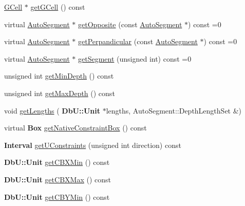 \begin{DoxyCompactItemize}
\mbox{\hyperlink{classKatabatic_1_1GCell}{G\+Cell}} $\ast$ \mbox{\hyperlink{classKatabatic_1_1AutoContact_a819cf639562a031a1e2e061fe1293d66}{get\+G\+Cell}} () const
\item 
virtual \mbox{\hyperlink{classKatabatic_1_1AutoSegment}{Auto\+Segment}} $\ast$ \mbox{\hyperlink{classKatabatic_1_1AutoContact_a48ab1d3bdf85712e4784ef83ef136939}{get\+Opposite}} (const \mbox{\hyperlink{classKatabatic_1_1AutoSegment}{Auto\+Segment}} $\ast$) const =0
\item 
virtual \mbox{\hyperlink{classKatabatic_1_1AutoSegment}{Auto\+Segment}} $\ast$ \mbox{\hyperlink{classKatabatic_1_1AutoContact_a994371005874f946cc0ac78005d38423}{get\+Perpandicular}} (const \mbox{\hyperlink{classKatabatic_1_1AutoSegment}{Auto\+Segment}} $\ast$) const =0
\item 
virtual \mbox{\hyperlink{classKatabatic_1_1AutoSegment}{Auto\+Segment}} $\ast$ \mbox{\hyperlink{classKatabatic_1_1AutoContact_a50531ded68cc5206fe104b8d8bf3bd87}{get\+Segment}} (unsigned int) const =0
\item 
unsigned int \mbox{\hyperlink{classKatabatic_1_1AutoContact_ada381cbb88211a7f63d30691b669b5e1}{get\+Min\+Depth}} () const
\item 
unsigned int \mbox{\hyperlink{classKatabatic_1_1AutoContact_ac350bb9d2d038287530fcf474987ba55}{get\+Max\+Depth}} () const
\item 
void \mbox{\hyperlink{classKatabatic_1_1AutoContact_ac607a624c0698056c5bccf405cf05ea7}{get\+Lengths}} (\textbf{ Db\+U\+::\+Unit} $\ast$lengths, Auto\+Segment\+::\+Depth\+Length\+Set \&)
\item 
virtual \textbf{ Box} \mbox{\hyperlink{classKatabatic_1_1AutoContact_a00ed934305dd186a284b7a13b5798cb6}{get\+Native\+Constraint\+Box}} () const
\item 
\textbf{ Interval} \mbox{\hyperlink{classKatabatic_1_1AutoContact_ab1fd3fec6dd56d40217b8a5ecacb1719}{get\+U\+Constraints}} (unsigned int direction) const
\item 
\textbf{ Db\+U\+::\+Unit} \mbox{\hyperlink{classKatabatic_1_1AutoContact_a347244bd3f3a59881a2dee9801c74618}{get\+C\+B\+X\+Min}} () const
\item 
\textbf{ Db\+U\+::\+Unit} \mbox{\hyperlink{classKatabatic_1_1AutoContact_a798750f964050c53c269a2e56d44b690}{get\+C\+B\+X\+Max}} () const
\item 
\textbf{ Db\+U\+::\+Unit} \mbox{\hyperlink{classKatabatic_1_1AutoContact_ad7ee1befb03ee85f237a36e2f5ab8e45}{get\+C\+B\+Y\+Min}} () const
\item 

\end{DoxyCompactItemize}
